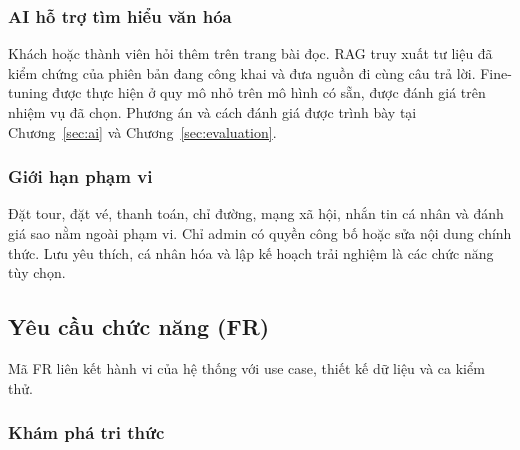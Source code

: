 \subsubsection{AI hỗ trợ tìm hiểu văn hóa}
Khách hoặc thành viên hỏi thêm trên trang bài đọc. RAG truy xuất tư liệu đã kiểm chứng của
phiên bản đang công khai và đưa nguồn đi cùng câu trả lời. Fine-tuning được thực hiện ở quy mô
nhỏ trên mô hình có sẵn, được đánh giá trên nhiệm vụ đã chọn. Phương án và cách đánh giá
được trình bày tại Chương~\ref{sec:ai} và Chương~\ref{sec:evaluation}.

\subsubsection{Giới hạn phạm vi}
Đặt tour, đặt vé, thanh toán, chỉ đường, mạng xã hội, nhắn tin cá nhân và đánh giá sao
nằm ngoài phạm vi. Chỉ admin có quyền công bố hoặc sửa nội dung chính thức. Lưu yêu thích,
cá nhân hóa và lập kế hoạch trải nghiệm là các chức năng tùy chọn.

\subsection{Yêu cầu chức năng (FR)}
Mã FR liên kết hành vi của hệ thống với use case, thiết kế dữ liệu và ca kiểm thử.


\ReportNeedSpace{48mm}
\subsubsection{Khám phá tri thức}

